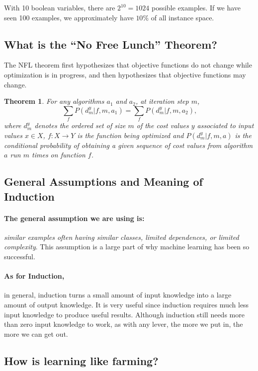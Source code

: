 \documentclass[12pt]{article}
\newtheorem{theorem}{Theorem}%
\begin{document}
With 10 boolean variables, there are $2^{10} = 1024$ possible examples. If we
have seen 100 examples, we approximately have $10\%$ of all instance space.

\subsection{What is the ``No Free Lunch'' Theorem?}

The NFL theorem first hypothesizes that objective functions do not change while
optimization is in progress, and then hypothesizes that objective functions may
change.

\begin{theorem}
    For any algorithms $a_1$ and $a_2$, at iteration step $m$,
    \[\sum_f P\left(d_m^y|f,m,a_1\right)=\sum_f P(d_m^y|f,m,a_2)\text{,}\]
    where $d_m^y$ denotes the ordered set of size $m$ of the cost values $y$
    associated to input values $x\in X$, $f:X \rightarrow Y$ is the function
    being optimized and $P(d_m^y|f,m,a)$ is the conditional probability of
    obtaining a given sequence of cost values from algorithm $a$ run $m$ times
    on function $f$.
\end{theorem}

\subsection{General Assumptions and Meaning of Induction}

\paragraph{The general assumption we are using is:} \emph{similar examples
often having similar classes, limited dependences, or limited complexity}. This
assumption is a large part of why machine learning has been so successful.

\paragraph{As for Induction,} in general, induction turns a small amount of
input knowledge into a large amount of output knowledge. It is very useful
since induction requires much less input knowledge to produce useful results.
Although induction still needs more than zero input knowledge to work, as with
any lever, the more we put in, the more we can get out.

\subsection{How is learning like farming? }
\end{document}
